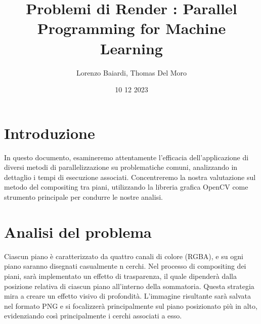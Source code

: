 \documentclass[11pt]{article}
\title{Problemi di Render : Parallel Programming for Machine Learning}
\author{Lorenzo Baiardi, Thomas Del Moro}
\date{10 12 2023}
\begin{document}
    \maketitle
    \clearpage

    \section{Introduzione}\label{sec:introduzione}
    In questo documento, esamineremo attentamente l'efficacia dell'applicazione di diversi metodi di parallelizzazione
    su problematiche comuni, analizzando in dettaglio i tempi di esecuzione associati.
    Concentreremo la nostra valutazione sul metodo del compositing tra piani, utilizzando la libreria grafica OpenCV
    come strumento principale per condurre le nostre analisi.

    \section{Analisi del problema}\label{sec:analisi-del-problema}
    Ciascun piano è caratterizzato da quattro canali di colore (RGBA), e su ogni piano saranno disegnati casualmente n cerchi.
    Nel processo di compositing dei piani, sarà implementato un effetto di trasparenza, il quale dipenderà dalla
    posizione relativa di ciascun piano all'interno della sommatoria.
    Questa strategia mira a creare un effetto visivo di profondità.
    L'immagine risultante sarà salvata nel formato PNG e si focalizzerà principalmente sul piano posizionato più in alto,
    evidenziando così principalmente i cerchi associati a esso.
\end{document}
